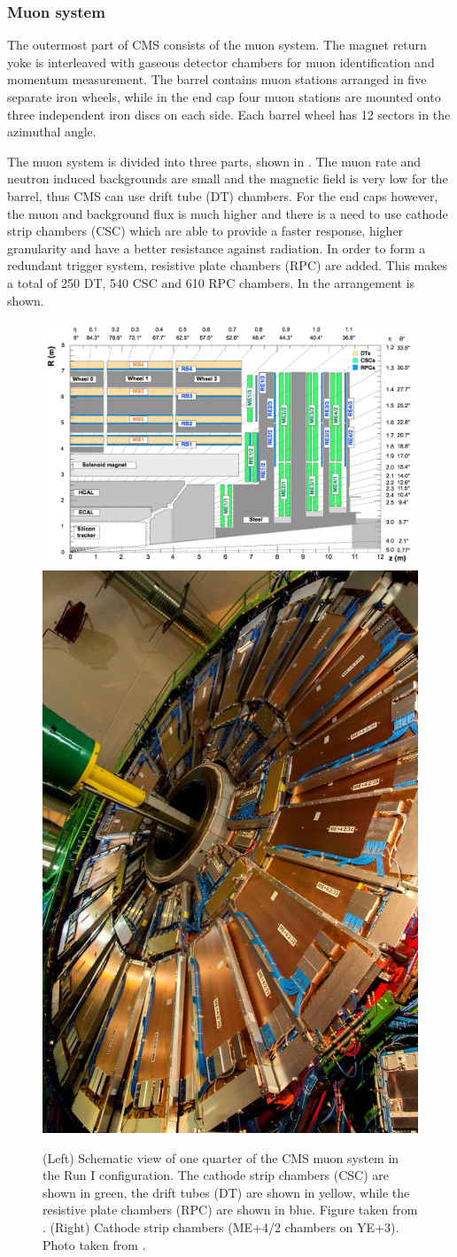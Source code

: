 \clearpage
\subsubsection{Muon system}
\label{sec:MUO}
The outermost part of CMS consists of the muon system. The magnet return yoke is interleaved with gaseous detector chambers for muon identification and momentum measurement. The barrel contains muon stations arranged in five separate iron wheels, while in the end cap four muon stations are mounted onto three independent iron discs on each side. Each barrel wheel has 12 sectors in the azimuthal angle. 

The muon system is divided into three parts, shown in . The muon rate and neutron induced backgrounds are small and the magnetic field is very low for the barrel, thus CMS can use drift tube (DT) chambers. For the end caps however, the muon and background flux is much higher and there is a need to use cathode strip chambers (CSC) which are able to provide a faster response, higher granularity and have a better resistance against radiation. In order to form a redundant trigger system, resistive plate chambers (RPC) are added. This makes a total of 250 DT, 540 CSC and 610 RPC chambers. In  the arrangement is shown.
\begin{figure}[htbp]
	\centering
	\includegraphics[width=.69\textwidth]{2_ExperimentalSetup/Figures/muonsys}
	\includegraphics[width=0.3\linewidth]{2_ExperimentalSetup/Figures/NfP5131122image6}
	\caption{(Left) Schematic view of one quarter of the CMS muon system in the Run I configuration. The cathode strip chambers (CSC) are shown in green, the drift tubes (DT) are shown in yellow, while the resistive plate chambers (RPC) are shown in blue. Figure  taken from \cite{Chatrchyan:1223944}. (Right) Cathode strip chambers (ME+4/2 chambers on YE+3). Photo taken from \cite{muon}.}
	\label{fig:muonsys}
\end{figure}


